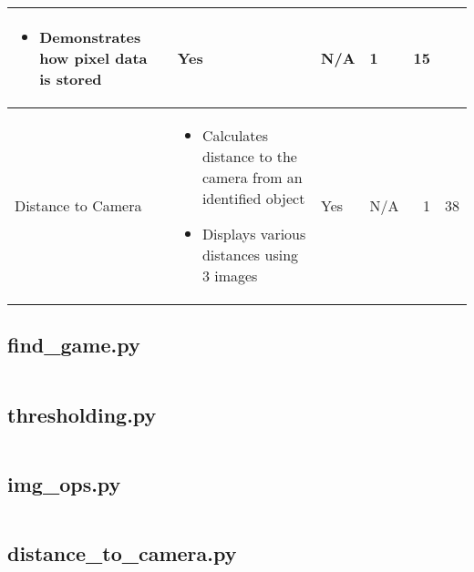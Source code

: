 \documentclass[a4paper, 12pt, hidelinks]{article}
\begin{document}
\begin{landscape}
\begin{table}[h!]
\begin{tabular}{|l|p{}|l|p{}|r|r|}
\begin{itemize}[noitemsep,topsep=0pt,parsep=0pt]
						\item{Demonstrates how pixel data is stored}
					\end{itemize}&
					Yes&
					N/A&
					1&
					15\\
					\hline
					Distance to Camera&
					\begin{itemize}[noitemsep,topsep=0pt,parsep=0pt]
						\item{Calculates distance to the camera from an identified object}
						\item{Displays various distances using 3 images}
					\end{itemize}&
					Yes&
					N/A&
					1&
					38\\
					\hline
				\end{tabular}
			\end{table}
		\end{landscape}
		\restoregeometry
		\subsection{find\_game.py}
		\inputminted[breaklines,
						linenos,
						frame=lines,
						fontsize=\footnotesize]{python}{../code/python/find_game.py}
		\subsection{thresholding.py}
		\inputminted[breaklines,
						linenos,
						frame=lines,
						fontsize=\footnotesize]{python}{../code/python/thresholding.py}
		\subsection{img\_ops.py}
		\inputminted[breaklines,
						linenos,
						frame=lines,
						fontsize=\footnotesize]{python}{../code/python/img_ops.py}
		\subsection{distance\_to\_camera.py}
		\inputminted[breaklines,
						linenos,
						frame=lines,
						fontsize=\footnotesize]{python}{../code/python/distance_to_camera.py}
		\todos
\end{document}
